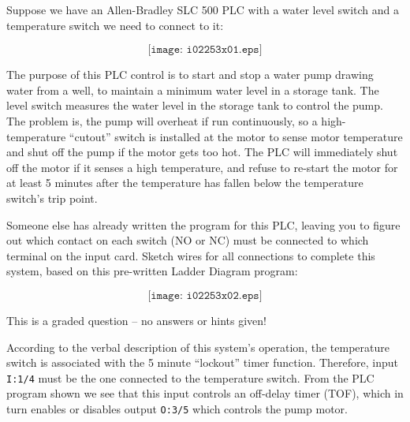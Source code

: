 

Suppose we have an Allen-Bradley SLC 500 PLC with a water level switch and a temperature switch we need to connect to it:

$$\texttt{[image: i02253x01.eps]}$$

The purpose of this PLC control is to start and stop a water pump drawing water from a well, to maintain a minimum water level in a storage tank.  The level switch measures the water level in the storage tank to control the pump.  The problem is, the pump will overheat if run continuously, so a high-temperature ``cutout'' switch is installed at the motor to sense motor temperature and shut off the pump if the motor gets too hot.  The PLC will immediately shut off the motor if it senses a high temperature, and refuse to re-start the motor for at least 5 minutes after the temperature has fallen below the temperature switch's trip point.

\filbreak

Someone else has already written the program for this PLC, leaving you to figure out which contact on each switch (NO or NC) must be connected to which terminal on the input card.  Sketch wires for all connections to complete this system, based on this pre-written Ladder Diagram program:

$$\texttt{[image: i02253x02.eps]}$$

\vfil 

\eject






This is a graded question -- no answers or hints given!







According to the verbal description of this system's operation, the temperature switch is associated with the 5 minute ``lockout'' timer function.  Therefore, input {\tt I:1/4} must be the one connected to the temperature switch.  From the PLC program shown we see that this input controls an off-delay timer (TOF), which in turn enables or disables output {\tt O:3/5} which controls the pump motor.

